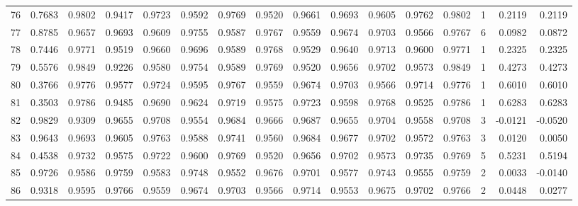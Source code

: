 \begin{tabular}{lrrrrrrrrrrrrrrr}
76  &      0.7683 &  0.9802 &  0.9417 &  0.9723 &  0.9592 &  0.9769 &  0.9520 &  0.9661 &  0.9693 &  0.9605 &   0.9762 &     0.9802 &      1 &                    0.2119 &                     0.2119 \\
77  &      0.8785 &  0.9657 &  0.9693 &  0.9609 &  0.9755 &  0.9587 &  0.9767 &  0.9559 &  0.9674 &  0.9703 &   0.9566 &     0.9767 &      6 &                    0.0982 &                     0.0872 \\
78  &      0.7446 &  0.9771 &  0.9519 &  0.9660 &  0.9696 &  0.9589 &  0.9768 &  0.9529 &  0.9640 &  0.9713 &   0.9600 &     0.9771 &      1 &                    0.2325 &                     0.2325 \\
79  &      0.5576 &  0.9849 &  0.9226 &  0.9580 &  0.9754 &  0.9589 &  0.9769 &  0.9520 &  0.9656 &  0.9702 &   0.9573 &     0.9849 &      1 &                    0.4273 &                     0.4273 \\
80  &      0.3766 &  0.9776 &  0.9577 &  0.9724 &  0.9595 &  0.9767 &  0.9559 &  0.9674 &  0.9703 &  0.9566 &   0.9714 &     0.9776 &      1 &                    0.6010 &                     0.6010 \\
81  &      0.3503 &  0.9786 &  0.9485 &  0.9690 &  0.9624 &  0.9719 &  0.9575 &  0.9723 &  0.9598 &  0.9768 &   0.9525 &     0.9786 &      1 &                    0.6283 &                     0.6283 \\
82  &      0.9829 &  0.9309 &  0.9655 &  0.9708 &  0.9554 &  0.9684 &  0.9666 &  0.9687 &  0.9655 &  0.9704 &   0.9558 &     0.9708 &      3 &                   -0.0121 &                    -0.0520 \\
83  &      0.9643 &  0.9693 &  0.9605 &  0.9763 &  0.9588 &  0.9741 &  0.9560 &  0.9684 &  0.9677 &  0.9702 &   0.9572 &     0.9763 &      3 &                    0.0120 &                     0.0050 \\
84  &      0.4538 &  0.9732 &  0.9575 &  0.9722 &  0.9600 &  0.9769 &  0.9520 &  0.9656 &  0.9702 &  0.9573 &   0.9735 &     0.9769 &      5 &                    0.5231 &                     0.5194 \\
85  &      0.9726 &  0.9586 &  0.9759 &  0.9583 &  0.9748 &  0.9552 &  0.9676 &  0.9701 &  0.9577 &  0.9743 &   0.9555 &     0.9759 &      2 &                    0.0033 &                    -0.0140 \\
86  &      0.9318 &  0.9595 &  0.9766 &  0.9559 &  0.9674 &  0.9703 &  0.9566 &  0.9714 &  0.9553 &  0.9675 &   0.9702 &     0.9766 &      2 &                    0.0448 &                     0.0277 \\

\end{tabular}
